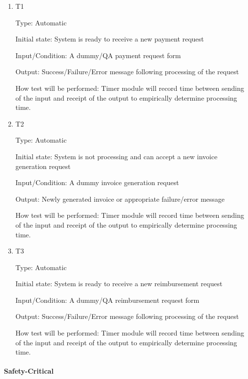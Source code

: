 \documentclass[12pt, titlepage]{article}
\begin{document}
\begin{enumerate}

\item{T1\\}

Type: Automatic

Initial state: System is ready to receive a new payment request

Input/Condition: A dummy/QA payment request form

Output: Success/Failure/Error message following processing of the request

How test will be performed: Timer module will record time between sending of the input and receipt of the output to empirically determine processing time.
 
					
\item{T2\\}

Type: Automatic

Initial state: System is not processing and can accept a new invoice generation request

Input/Condition: A dummy invoice generation request

Output: Newly generated invoice or appropriate failure/error message

How test will be performed: Timer module will record time between sending of the input and receipt of the output to empirically determine processing time.

\item{T3\\}

Type: Automatic

Initial state: System is ready to receive a new reimbursement request

Input/Condition: A dummy/QA reimbursement request form

Output: Success/Failure/Error message following processing of the request

How test will be performed: Timer module will record time between sending of the input and receipt of the output to empirically determine processing time.

\end{enumerate}

\paragraph{Safety-Critical}
\end{document}
